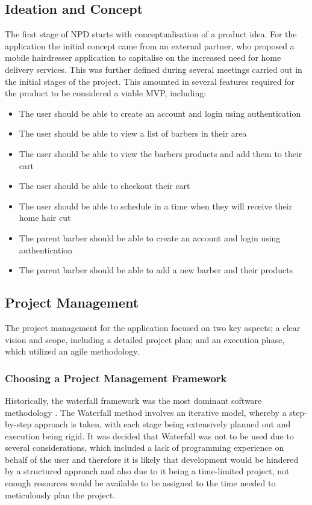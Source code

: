 \documentclass[12pt]{article}
\begin{document}
	\subsection{Ideation and Concept}
	\label{ideation-concept}
	The first stage of NPD starts with conceptualisation of a product idea. For the application the initial concept came from an external partner, who proposed a mobile hairdresser application to capitalise on the increased need for home delivery services. This was further defined during several meetings carried out in the initial stages of the project. This amounted in several features required for the product to be considered a viable MVP, including:
	\begin{itemize}
		\item The user should be able to create an account and login using authentication
		\item The user should be able to view a list of barbers in their area
		\item The user should be able to view the barbers products and add them to their cart
		\item The user should be able to checkout their cart
		\item The user should be able to schedule in a time when they will receive their home hair cut
		\item The parent barber should be able to create an account and login using authentication
		\item The parent barber should be able to add a new barber and their products

	\end{itemize}

	\subsection{Project Management}

	The project management for the application focused on two key aspects; a clear vision and scope, including a detailed project plan; and an execution phase, which utilized an agile methodology.
	
	\subsubsection{Choosing a Project Management Framework}
	Historically, the waterfall framework was the most dominant software methodology \cite{AgileWaterfall2021}. The Waterfall method involves an iterative model, whereby a step-by-step approach is taken, with each stage being extensively planned out and execution being rigid. 
	It was decided that Waterfall was not to be used due to several considerations, which included a lack of programming experience on behalf of the user and therefore it is likely that development would be hindered by a structured approach and also due to it being a time-limited project, not enough resources would be available to be assigned to the time needed to meticulously plan the project.
	
\end{document}
